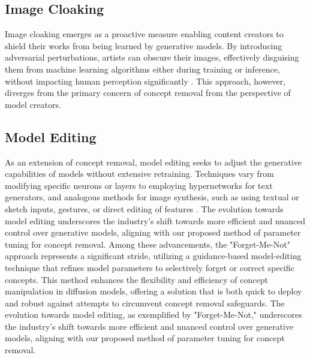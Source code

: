 \subsection{Image Cloaking}
Image cloaking emerges as a proactive measure enabling content creators to shield their works from being learned by generative models. By introducing adversarial perturbations, artists can obscure their images, effectively disguising them from machine learning algorithms either during training or inference, without impacting human perception significantly \cite{36,42}. This approach, however, diverges from the primary concern of concept removal from the perspective of model creators.

\subsection{Model Editing}
As an extension of concept removal, model editing seeks to adjust the generative capabilities of models without extensive retraining. Techniques vary from modifying specific neurons or layers \cite{7,23} to employing hypernetworks \cite{8,24} for text generators, and analogous methods for image synthesis, such as using textual or sketch inputs, gestures, or direct editing of features \cite{2,14,46,47}. The evolution towards model editing underscores the industry's shift towards more efficient and nuanced control over generative models, aligning with our proposed method of parameter tuning for concept removal.
Among these advancements, the "Forget-Me-Not" \cite*{zhang2023forgetmenot} approach represents a significant stride, utilizing a guidance-based model-editing technique that refines model parameters to selectively forget or correct specific concepts. This method enhances the flexibility and efficiency of concept manipulation in diffusion models, offering a solution that is both quick to deploy and robust against attempts to circumvent concept removal safeguards. The evolution towards model editing, as exemplified by "Forget-Me-Not," underscores the industry's shift towards more efficient and nuanced control over generative models, aligning with our proposed method of parameter tuning for concept removal.



